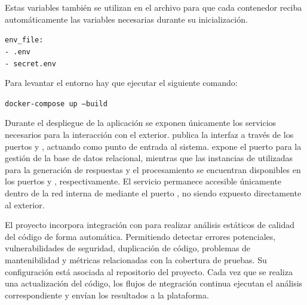 Estas variables también se utilizan en el archivo  para que cada contenedor reciba automáticamente las variables necesarias durante su inicialización. 

\begin{tcolorbox}[
	colback=cyan!5,
	colframe=cyan!50!black,
	title=docker-compose.yml,
	fonttitle=\bfseries,
	breakable
]
	{\footnotesize
		\noindent
		\texttt{env\_file:}\\
		\hspace*{1em}\texttt{- .env}\\
		\hspace*{1em}\texttt{- secret.env}
	}
\end{tcolorbox}


Para levantar el entorno  hay que ejecutar el siguiente comando:

\begin{tcolorbox}[
	colback=black!3,
	colframe=black!30,
	boxrule=0.5pt,
	arc=2mm,
	title= Terminal,
	fonttitle=\bfseries,
	breakable
]
	{\footnotesize
		\noindent
		\texttt{docker-compose up --build}
	}
\end{tcolorbox}

Durante el despliegue de la aplicación se exponen únicamente los servicios necesarios para la interacción con el exterior.  publica la interfaz  a través de los puertos  y , actuando como punto de entrada al sistema.  expone el puerto  para la gestión de la base de datos relacional, mientras que las instancias de  utilizadas para la generación de respuestas y el procesamiento  se encuentran disponibles en los puertos  y , respectivamente. El servicio  permanece accesible únicamente dentro de la red interna de  mediante el puerto , no siendo expuesto directamente al exterior.

El proyecto incorpora integración con  para realizar análisis estáticos de calidad del código de forma automática. Permitiendo detectar errores potenciales, vulnerabilidades de seguridad, duplicación de código, problemas de mantenibilidad y métricas relacionadas con la cobertura de pruebas. Su configuración está asociada al repositorio  del proyecto. Cada vez que se realiza una actualización del código, los flujos de ntegración continua ejecutan el análisis correspondiente y envían los resultados a la plataforma.



